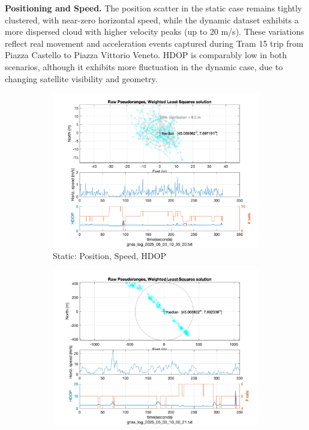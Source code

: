     
        \vspace{0.5em}
        \textbf{Positioning and Speed.} 
        The position scatter in the static case remains tightly clustered, with near-zero horizontal speed, while the dynamic dataset exhibits a more dispersed cloud with higher velocity peaks (up to 20 m/s). 
        These variations reflect real movement and acceleration events captured during Tram 15 trip from Piazza Castello to Piazza Vittorio Veneto. 
        HDOP is comparably low in both scenarios, although it exhibits more fluctuation in the dynamic case, due to changing satellite visibility and geometry.
    
        \begin{figure}[h!]
            \centering
            \begin{subfigure}{0.23\textwidth}
                \includegraphics[width=\textwidth]{images/tests/Monte_Cappuccini/png/Samsung_A51_Monte_Cappuccini_fig4.png}
                \caption{Static: Position, Speed, HDOP}
            \end{subfigure}
            \hfill
            \begin{subfigure}{0.23\textwidth}
                \includegraphics[width=\textwidth]{images/tests/Tram_15_trip_Castello_to_Pescatore/filtered/Samsung_A51_Tram_15_trip_Castello_to_Pescatore_fig4.png}

\end{subfigure}
\end{figure}
